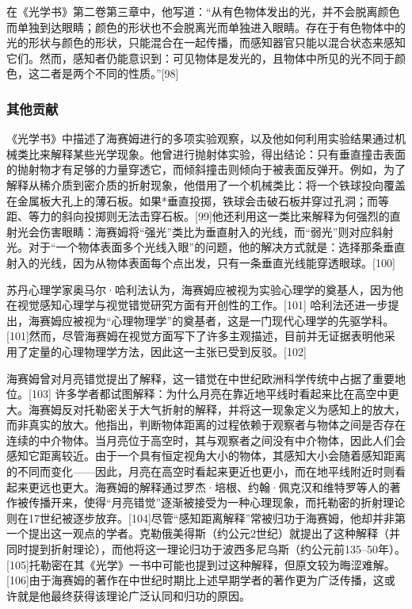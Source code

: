 在《光学书》第二卷第三章中，他写道：“从有色物体发出的光，并不会脱离颜色而单独到达眼睛；颜色的形状也不会脱离光而单独进入眼睛。存在于有色物体中的光的形状与颜色的形状，只能混合在一起传播，而感知器官只能以混合状态来感知它们。然而，感知者仍能意识到：可见物体是发光的，且物体中所见的光不同于颜色，这二者是两个不同的性质。”[98]
\subsubsection{其他贡献}
《光学书》中描述了海赛姆进行的多项实验观察，以及他如何利用实验结果通过机械类比来解释某些光学现象。他曾进行抛射体实验，得出结论：只有垂直撞击表面的抛射物才有足够的力量穿透它，而倾斜撞击则倾向于被表面反弹开。例如，为了解释从稀介质到密介质的折射现象，他借用了一个机械类比：将一个铁球投向覆盖在金属板大孔上的薄石板。如果*垂直投掷，铁球会击破石板并穿过孔洞；而等距、等力的斜向投掷则无法击穿石板。[99]他还利用这一类比来解释为何强烈的直射光会伤害眼睛：海赛姆将“强光”类比为垂直射入的光线，而“弱光”则对应斜射光。对于“一个物体表面多个光线入眼”的问题，他的解决方式就是：选择那条垂直射入的光线，因为从物体表面每个点出发，只有一条垂直光线能穿透眼球。[100]

苏丹心理学家奥马尔·哈利法认为，海赛姆应被视为实验心理学的奠基人，因为他在视觉感知心理学与视觉错觉研究方面有开创性的工作。[101]
哈利法还进一步提出，海赛姆应被视为“心理物理学”的奠基者，这是一门现代心理学的先驱学科。[101]然而，尽管海赛姆在视觉方面写下了许多主观描述，目前并无证据表明他采用了定量的心理物理学方法，因此这一主张已受到反驳。[102]

海赛姆曾对月亮错觉提出了解释，这一错觉在中世纪欧洲科学传统中占据了重要地位。[103]
许多学者都试图解释：为什么月亮在靠近地平线时看起来比在高空中更大。海赛姆反对托勒密关于大气折射的解释，并将这一现象定义为感知上的放大，而非真实的放大。他指出，判断物体距离的过程依赖于观察者与物体之间是否存在连续的中介物体。当月亮位于高空时，其与观察者之间没有中介物体，因此人们会感知它距离较近。由于一个具有恒定视角大小的物体，其感知大小会随着感知距离的不同而变化——因此，月亮在高空时看起来更近也更小，而在地平线附近时则看起来更远也更大。海赛姆的解释通过罗杰·培根、约翰·佩克汉和维特罗等人的著作被传播开来，使得“月亮错觉”逐渐被接受为一种心理现象，而托勒密的折射理论则在17世纪被逐步放弃。[104]尽管“感知距离解释”常被归功于海赛姆，他却并非第一个提出这一观点的学者。克勒俄美得斯（约公元2世纪）就提出了这种解释（并同时提到折射理论），而他将这一理论归功于波西多尼乌斯（约公元前135–50年）。[105]托勒密在其《光学》一书中可能也提到过这种解释，但原文较为晦涩难解。[106]由于海赛姆的著作在中世纪时期比上述早期学者的著作更为广泛传播，这或许就是他最终获得该理论广泛认同和归功的原因。
